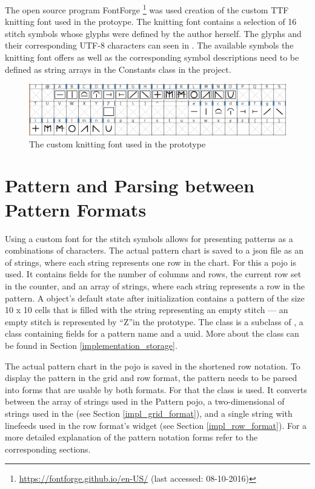The open source program FontForge \footnote{\url{https://fontforge.github.io/en-US/} (last accessed: 08-10-2016)} was used creation of the custom \gls{TTF} knitting font used in the protoype. The knitting font contains a selection of 16 stitch symbols whose glyphs were defined by the author herself. The glyphs and their corresponding UTF-8 characters can seen in . The available symbols the knitting font offers as well as the corresponding symbol descriptions need to be defined as string arrays in the Constants class in the project.

\begin{figure}[H]
  \centering
  \includegraphics[width=.7\textwidth]{images/OwnKnittingFont_Chart.png}
  \caption[The custom knitting font used in the prototype \protect{}]{The custom knitting font used in the prototype} 
  \label{fig:own_knitting_font} 
\end{figure}

\section{Pattern and Parsing between Pattern Formats}
Using a custom font for the stitch symbols allows for presenting patterns as a combinations of characters. The actual pattern chart is saved to a \gls{json} file as an  of strings, where each string represents one row in the chart. For this a  \gls{pojo} is used. It contains fields for the number of columns and rows, the current row set in the counter, and an array of strings, where each string represents a row in the pattern. A  object’s default state after initialization contains a pattern of the size 10 x 10  cells that is filled with the string representing an empty stitch --- an empty stitch is represented by ``Z''in the prototype. The class  is a subclass of , a class containing fields for a pattern name and a \gls{uuid}. More about the  class can be found in Section \ref{implementation_storage}.

The actual pattern chart in the  \gls{pojo} is saved in the shortened row notation. To display the pattern in the grid and row format, the pattern needs to be parsed into forms that are usable by both formats. For that the class  is used. It converts between the array of strings used in the Pattern \gls{pojo}, a two-dimensional  of strings used in the  (see Section \ref{impl_grid_format}), and a single string with linefeeds used in the row format's  widget (see Section \ref{impl_row_format}). For a more detailed explanation of the pattern notation forms refer to the corresponding sections.


